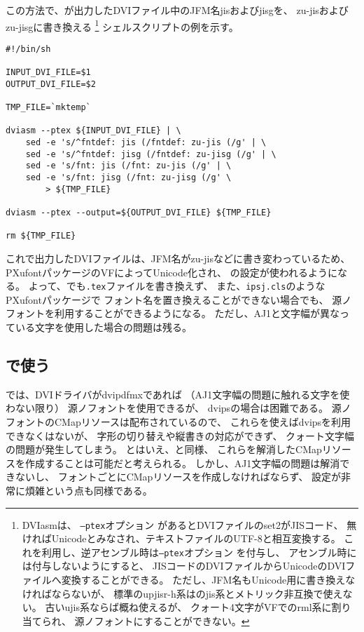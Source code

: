 この方法で、\pTeX が出力したDVIファイル中のJFM名jisおよびjisgを、
zu-jisおよびzu-jisgに書き換える
\footnote{DVIasmは、
  \texttt{\textcompwordmark --ptex}オプション
  があるとDVIファイルのset2がJISコード、
  無ければUnicodeとみなされ、テキストファイルのUTF-8と相互変換する。
  これを利用し、逆アセンブル時は\texttt{\textcompwordmark --ptex}オプション
  を付与し、
  アセンブル時には付与しないようにすると、
  JISコードのDVIファイルからUnicodeのDVIファイルへ変換することができる。
  ただし、JFM名もUnicode用に書き換えなければならないが、
  \upTeX 標準のupjisr-h系は\pTeX のjis系とメトリック非互換で使えない。
  古いujis系ならば概ね使えるが、
  クォート4文字がVFで\pTeX のrml系に割り当てられ、
  源ノフォントにすることができない。}
シェルスクリプトの例を示す。

\begin{tcolorbox}[left=0mm,right=0mm,top=0mm,bottom=0mm]
\begin{lstlisting}
#!/bin/sh

INPUT_DVI_FILE=$1
OUTPUT_DVI_FILE=$2

TMP_FILE=`mktemp`

dviasm --ptex ${INPUT_DVI_FILE} | \
    sed -e 's/^fntdef: jis (/fntdef: zu-jis (/g' | \
    sed -e 's/^fntdef: jisg (/fntdef: zu-jisg (/g' | \
    sed -e 's/fnt: jis (/fnt: zu-jis (/g' | \
    sed -e 's/fnt: jisg (/fnt: zu-jisg (/g' \
        > ${TMP_FILE}

dviasm --ptex --output=${OUTPUT_DVI_FILE} ${TMP_FILE}

rm ${TMP_FILE}
\end{lstlisting}
\end{tcolorbox}

これで出力したDVIファイルは、JFM名がzu-jisなどに書き変わっているため、
PXufontパッケージのVFによってUnicode化され、
\upTeX の設定が使われるようになる。
よって、\pTeX でも\texttt{\textcompwordmark .tex}ファイルを書き換えず、
また、\texttt{ipsj.cls}のようなPXufontパッケージで
フォント名を置き換えることができない場合でも、
源ノフォントを利用することができるようになる。
ただし、AJ1と文字幅が異なっている文字を使用した場合の問題は残る。

\subsection{\upTeX で使う}

\upTeX では、DVIドライバがdvipdfmxであれば
（AJ1文字幅の問題に触れる文字を使わない限り）
源ノフォントを使用できるが、
dvipsの場合は困難である。
源ノフォントのCMapリソースは配布されているので、
これらを使えばdvipsを利用できなくはないが、
字形の切り替えや縦書きの対応ができず、
クォート文字幅の問題が発生してしまう。
とはいえ、\pTeX と同様、
これらを解消したCMapリソースを作成することは可能だと考えられる。
しかし、AJ1文字幅の問題は解消できないし、
フォントごとにCMapリソースを作成しなければならず、
設定が非常に煩雑という点も同様である。

